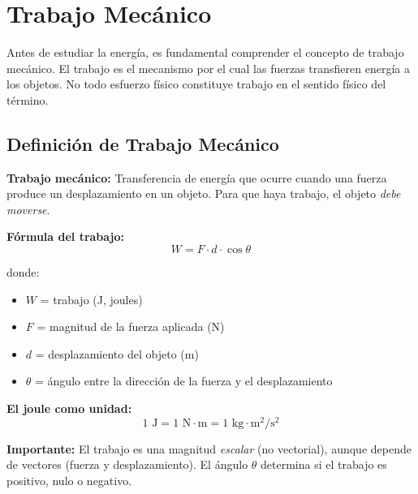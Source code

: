 \renewcommand{\tema}{Lección: Trabajo y Leyes de la Conservación}

\section{Trabajo Mecánico}

\begin{seccion}
Antes de estudiar la energía, es fundamental comprender el concepto de trabajo mecánico. El trabajo es el mecanismo por el cual las fuerzas transfieren energía a los objetos. No todo esfuerzo físico constituye trabajo en el sentido físico del término.
\end{seccion}

\subsection{Definición de Trabajo Mecánico}

\begin{seccion}
\begin{definicion}
    \textbf{Trabajo mecánico:} Transferencia de energía que ocurre cuando una fuerza produce un desplazamiento en un objeto. Para que haya trabajo, el objeto \textit{debe moverse}.
\end{definicion}

\begin{ecuacion}
\textbf{Fórmula del trabajo:}
$$W = F \cdot d \cdot \cos\theta$$

donde:
\begin{itemize}
    \item $W$ = trabajo (J, joules)
    \item $F$ = magnitud de la fuerza aplicada (N)
    \item $d$ = desplazamiento del objeto (m)
    \item $\theta$ = ángulo entre la dirección de la fuerza y el desplazamiento
\end{itemize}
\end{ecuacion}

\textbf{El joule como unidad:}
$$1 \text{ J} = 1 \text{ N} \cdot \text{m} = 1 \text{ kg} \cdot \text{m}^2/\text{s}^2$$

\begin{nota}
    \textbf{Importante:} El trabajo es una magnitud \textit{escalar} (no vectorial), aunque depende de vectores (fuerza y desplazamiento). El ángulo $\theta$ determina si el trabajo es positivo, nulo o negativo.
\end{nota}
\end{seccion}

